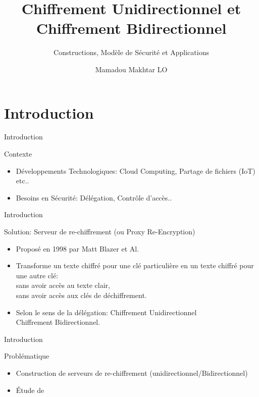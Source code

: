 \documentclass{beamer}
\title{Chiffrement Unidirectionnel et Chiffrement Bidirectionnel}
\subtitle{Constructions, Modèle de Sécurité et Applications}
\author{Mamadou Makhtar LO}
\begin{document}
\begin{frame}[plain]
    \maketitle
\end{frame}
\section*{Introduction}

\begin{frame}{Introduction}
	\begin{block}{Contexte}
	\begin{itemize}
		\item Développements Technologiques: Cloud Computing, Partage de fichiers (IoT) etc..
		\item Besoins en Sécurité: Délégation, Contrôle d'accès..  
	\end{itemize}
\end{block}
\end{frame}

\begin{frame}{Introduction}
	\begin{block}{Solution:}
		Serveur de re-chiffrement (ou Proxy Re-Encryption)
		\begin{itemize}
			\item Proposé en 1998 par Matt Blazer et Al.
			\item Transforme un texte chiffré pour une clé particulière en un texte chiffré pour une autre clé:\\
			sans avoir accès au texte clair,\\
			sans avoir accès aux clés de déchiffrement.
			\item Selon le sens de la délégation:
			Chiffrement Unidirectionnel\\
			Chiffrement Bidirectionnel.
		\end{itemize}
		
	\end{block}
\end{frame}

\begin{frame}{Introduction}
	\begin{block}{Problématique}
		\begin{itemize}
			\item Construction de serveurs de re-chiffrement (unidirectionnel/Bidirectionnel)
			\item Étude de
		\end{itemize}
	\end{block}
\end{frame}
\end{document}
